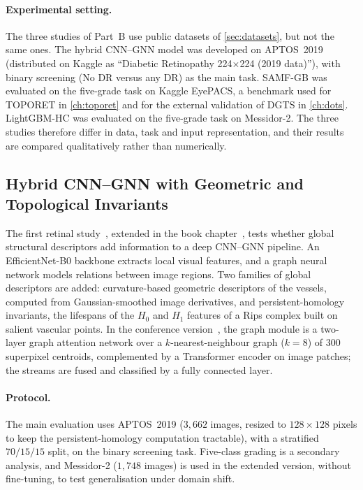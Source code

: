 \paragraph{Experimental setting.}
The three studies of Part~B use public datasets of \cref{sec:datasets}, but not the same
ones. The hybrid CNN--GNN model was developed on APTOS~2019 (distributed on Kaggle as
``Diabetic Retinopathy 224$\times$224 (2019 data)''), with binary screening (No DR versus
any DR) as the main task. SAMF-GB was evaluated on the five-grade task on Kaggle EyePACS,
a benchmark used for TOPORET in \cref{ch:toporet} and for the external validation of
DGTS in \cref{ch:dots}. LightGBM-HC was
evaluated on the five-grade task on Messidor-2. The three studies therefore differ in
data, task and input representation, and their results are compared qualitatively rather
than numerically.

\subsection{Hybrid CNN--GNN with Geometric and Topological Invariants}
\label{sec:hybrid}

The first retinal study~\cite{belhadj2026hybrid}, extended in the book
chapter~\cite{mezghich2026lnaitopo}, tests whether global structural descriptors add
information to a deep CNN--GNN pipeline. An EfficientNet-B0 backbone extracts local visual
features, and a graph neural network models relations between image regions. Two families
of global descriptors are added: curvature-based geometric descriptors of the vessels,
computed from Gaussian-smoothed image derivatives, and persistent-homology invariants, the
lifespans of the $H_0$ and $H_1$ features of a Rips complex built on salient vascular points.
In the conference version~\cite{belhadj2026hybrid}, the graph module is a two-layer graph
attention network over a $k$-nearest-neighbour graph ($k=8$) of $300$ superpixel
centroids, complemented by a Transformer encoder on image patches; the streams are fused
and classified by a fully connected layer.

\paragraph{Protocol.}
The main evaluation uses APTOS~2019 ($3{,}662$ images, resized to $128\times128$ pixels to
keep the persistent-homology computation tractable), with a stratified $70/15/15$ split,
on the binary screening task. Five-class grading is a secondary analysis, and Messidor-2
($1{,}748$ images) is used in the extended version, without fine-tuning, to test
generalisation under domain shift.

